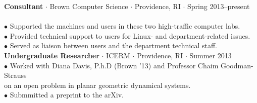 \documentclass{res}
\begin{document}
\begin{resume}
\begin{tabbing}
\sbreak
{\bf Consultant} $\cdot$ Brown Computer Science $\cdot$ Providence, RI $\cdot$ Spring 2013--present\\
	\\
	\>$\bullet$ Supported the machines and users in these two high-traffic computer labs.\\
	\>$\bullet$ Provided technical support to users for Linux- and department-related issues.\\
	\>$\bullet$ Served as  liaison between users and the department technical staff.\\
\sbreak
{\bf Undergraduate Researcher} $\cdot$ ICERM $\cdot$ Providence, RI $\cdot$ Summer 2013\\
	\>$\bullet$ Worked with Diana Davis, P.h.D (Brown '13) and Professor Chaim Goodman-Strauss\\\>\phantom{$\bullet$} on an open problem in planar geometric dynamical systems.\\
	\>$\bullet$ Submmitted a preprint to the arXiv.\\	



   \end{tabbing}
\sectionVspace %

\end{resume}
\end{document}
